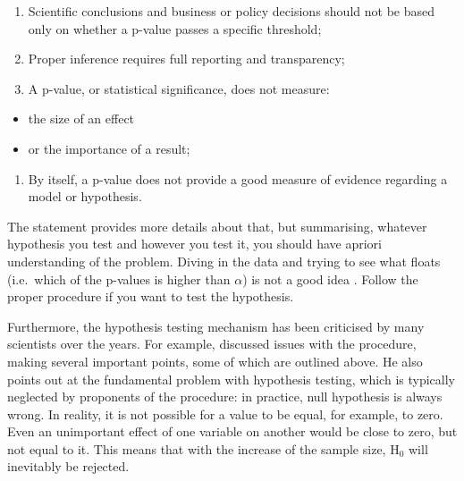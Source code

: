 \documentclass[
]{book}
\providecommand{\tightlist}{%
  \setlength{\itemsep}{0pt}\setlength{\parskip}{0pt}}
\theoremstyle{definition}
\theoremstyle{definition}
\theoremstyle{definition}
\theoremstyle{definition}
\theoremstyle{remark}
\begin{document}
\begin{enumerate}
\def\labelenumi{\arabic{enumi}.}
\setcounter{enumi}{2}
\tightlist
\item
  Scientific conclusions and business or policy decisions should not be based only on whether a p-value passes a specific threshold;
\item
  Proper inference requires full reporting and transparency;
\item
  A p-value, or statistical significance, does not measure:
\end{enumerate}

\begin{itemize}
\tightlist
\item
  the size of an effect
\item
  or the importance of a result;
\end{itemize}

\begin{enumerate}
\def\labelenumi{\arabic{enumi}.}
\setcounter{enumi}{5}
\tightlist
\item
  By itself, a p-value does not provide a good measure of evidence regarding a model or hypothesis.
\end{enumerate}

The statement provides more details about that, but summarising, whatever hypothesis you test and however you test it, you should have apriori understanding of the problem. Diving in the data and trying to see what floats (i.e.~which of the p-values is higher than \(\alpha\)) is not a good idea \citep{Wasserstein2016}. Follow the proper procedure if you want to test the hypothesis.

Furthermore, the hypothesis testing mechanism has been criticised by many scientists over the years. For example, \citet{Cohen1994} discussed issues with the procedure, making several important points, some of which are outlined above. He also points out at the fundamental problem with hypothesis testing, which is typically neglected by proponents of the procedure: in practice, null hypothesis is always wrong. In reality, it is not possible for a value to be equal, for example, to zero. Even an unimportant effect of one variable on another would be close to zero, but not equal to it. This means that with the increase of the sample size, \(\mathrm{H}_0\) will inevitably be rejected.
\end{document}

